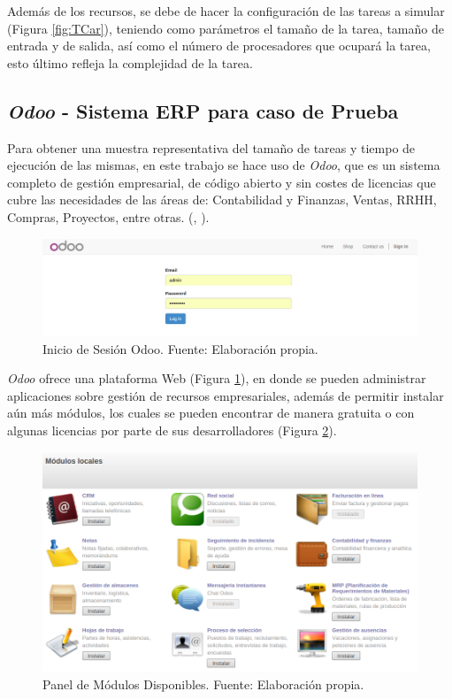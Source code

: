 Adem\'as de los recursos, se debe de hacer la configuraci\'on de las tareas a simular (Figura \ref{fig:TCar}), teniendo como par\'ametros el tamaño de la tarea, tamaño de entrada y de salida, as\'i como el número de procesadores que ocupar\'a la tarea, esto \'ultimo refleja la complejidad de la tarea.

\subsection*{\textit{Odoo} - Sistema ERP para caso de Prueba}

Para obtener una muestra representativa del tamaño de tareas y tiempo de ejecución de las mismas, en este trabajo se hace uso de \textit{Odoo}, que es un sistema completo de gestión empresarial, de código abierto y sin costes de licencias que cubre las necesidades de las áreas de: Contabilidad y Finanzas, Ventas, RRHH, Compras, Proyectos, entre otras. (\citeauthor{odooWiki}, \citeyear{odooWiki}).

\renewcommand\thefigure{\arabic{figure}}
\begin{figure}[h!]
	\centering
	\includegraphics[scale=0.3]{media/odoo/1}
	\caption{Inicio de Sesión Odoo. Fuente: Elaboración propia.}
	\label{fig:loginOdoo}
\end{figure}


\textit{Odoo} ofrece una plataforma Web (Figura \ref{fig:loginOdoo}), en donde se pueden administrar aplicaciones sobre gestión de recursos empresariales, además de permitir instalar aún más módulos, los cuales se pueden encontrar de manera gratuita o con algunas licencias por parte de sus desarrolladores (Figura \ref{fig:OdooApps}).

\renewcommand\thefigure{\arabic{figure}}
\begin{figure}[h!]
	\centering
	\includegraphics[scale=0.3]{media/odoo/2}
	\caption{Panel de Módulos Disponibles. Fuente: Elaboración propia.}
	\label{fig:OdooApps}
\end{figure}

